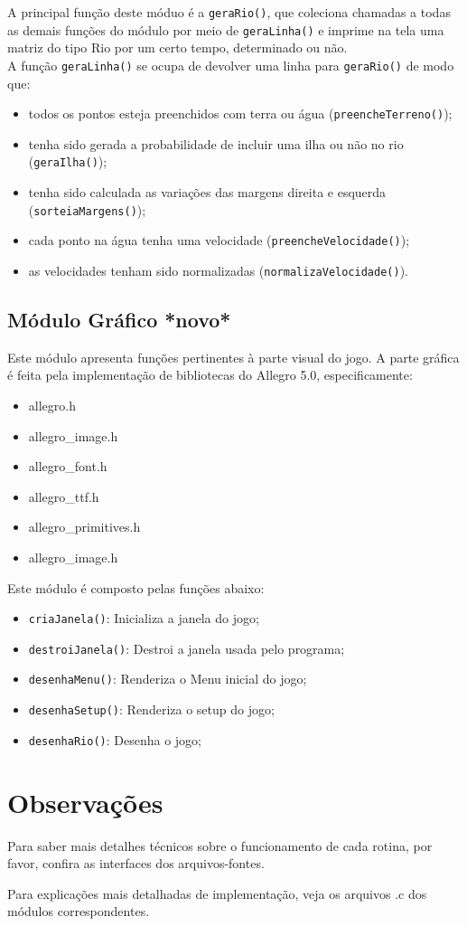 \documentclass[11pt,a4paper]{article}
\begin{document}
A principal função deste móduo é a \verb|geraRio()|, que coleciona chamadas a todas as demais funções do módulo por meio de \verb|geraLinha()| e imprime na tela uma matriz do tipo Rio por um certo tempo, determinado ou não. \\

A função \verb|geraLinha()| se ocupa de devolver uma linha para \verb|geraRio()| de modo que:
\begin{itemize}
\item todos os pontos esteja preenchidos com terra ou água (\verb|preencheTerreno()|);
\item tenha sido gerada a probabilidade de incluir uma ilha ou não no rio (\verb|geraIlha()|);
\item tenha sido calculada as variações das margens direita e esquerda \\(\verb|sorteiaMargens()|);
\item cada ponto na água tenha uma velocidade (\verb|preencheVelocidade()|);
\item as velocidades tenham sido normalizadas (\verb|normalizaVelocidade()|).
\end{itemize}

\subsection{Módulo Gráfico *novo*}
Este módulo apresenta funções pertinentes à parte visual do jogo. A parte gráfica é feita pela implementação de bibliotecas do Allegro 5.0, especificamente:
\begin{itemize}
\item allegro.h
\item allegro\_image.h
\item allegro\_font.h
\item allegro\_ttf.h
\item allegro\_primitives.h
\item allegro\_image.h
\end{itemize}

Este módulo é composto pelas funções abaixo:
\begin{itemize}
\item \verb|criaJanela()|: Inicializa a janela do jogo;
\item \verb|destroiJanela()|: Destroi a janela usada pelo programa;
\item \verb|desenhaMenu()|: Renderiza o Menu inicial do jogo;
\item \verb|desenhaSetup()|: Renderiza o setup do jogo;
\item \verb|desenhaRio()|: Desenha o jogo;
\end{itemize}

\section{Observações}
Para saber mais detalhes técnicos sobre o funcionamento de cada rotina, por favor, confira as interfaces dos arquivos-fontes.

Para explicações mais detalhadas de implementação, veja os arquivos .c dos módulos correspondentes.
\end{document}
